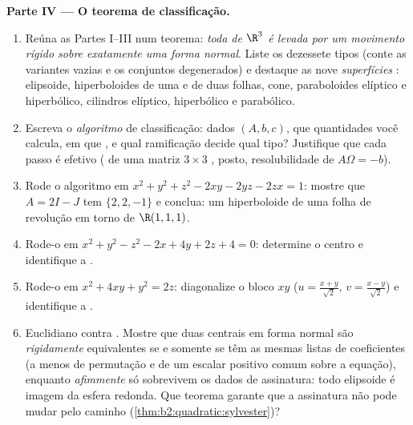 \begin{problem}
\medskip
\noindent\textbf{Parte IV --- O teorema de classificação.}
\begin{enumerate}[resume]
  \item Reúna as Partes I--III num teorema: \emph{toda
         de $\R^3$ é levada por um movimento rígido sobre
        exatamente uma forma normal}. Liste os dezessete tipos
         (conte as variantes vazias e os conjuntos degenerados)
        e destaque as nove \emph{superfícies} :
        elipsoide, hiperboloides de uma e de duas folhas, cone,
        paraboloides elíptico e hiperbólico, cilindros elíptico,
        hiperbólico e parabólico.
  \item Escreva o \emph{algoritmo} de classificação: dados $(A,
        b, c)$, que quantidades você calcula, em que
        , e qual ramificação decide qual tipo? Justifique
        que cada passo é efetivo ( de uma
        matriz $3\times3$ , posto, resolubilidade de
        $A\Omega = -b$).
  \item Rode o algoritmo em $x^2 + y^2 + z^2 - 2xy - 2yz -
        2zx = 1$: mostre que $A = 2I - J$ tem  $\{2, 2,
        -1\}$ e conclua: um hiperboloide de uma folha de
        revolução em torno de $\R(1,1,1)$.
  \item Rode-o em $x^2 + y^2 - z^2 - 2x + 4y + 2z + 4 = 0$:
        determine o centro e identifique a .
  \item Rode-o em $x^2 + 4xy + y^2 = 2z$: diagonalize o
        bloco $xy$ ($u = \frac{x+y}{\sqrt2}$, $v =
        \frac{x-y}{\sqrt2}$) e identifique a .
  \item Euclidiano contra . Mostre que duas 
        centrais em forma normal são \emph{rigidamente} equivalentes
        se e somente se têm as mesmas listas de coeficientes (a menos de
        permutação e de um escalar positivo comum sobre a
        equação), enquanto \emph{afimmente} só sobrevivem os
        dados de assinatura: todo elipsoide é imagem  da
        esfera redonda. Que teorema garante que a
        assinatura não pode mudar pelo caminho
        (\cref{thm:b2:quadratic:sylvester})?
\end{enumerate}


\end{problem}
